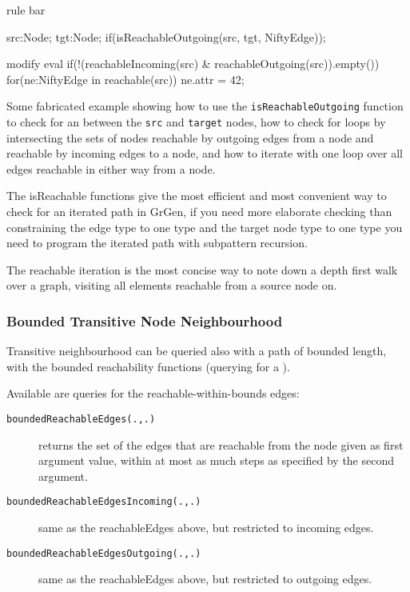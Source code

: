 \begin{example}
\begin{grgen}
rule bar {
    src:Node; 
    tgt:Node;
    if(isReachableOutgoing(src, tgt, NiftyEdge));
    
    modify {
        eval {
            if(!(reachableIncoming(src) & reachableOutgoing(src)).empty())
            {
                for(ne:NiftyEdge in reachable(src))
                {
                    ne.attr = 42;
                }
            }
        }
    }
}
\end{grgen}
Some fabricated example showing how to use the \texttt{isReachableOutgoing} function to check for an  between the \texttt{src} and \texttt{target} nodes, how to check for loops by intersecting the sets of nodes reachable by outgoing edges from a node and reachable by incoming edges to a node, and how to iterate with one loop over all edges reachable in either way from a node.

The isReachable functions give the most efficient and most convenient way to check for an iterated path in GrGen, if you need more elaborate checking than constraining the edge type to one type and the target node type to one type you need to program the iterated path with subpattern recursion.

The reachable iteration is the most concise way to note down a depth first walk over a graph, visiting all elements reachable from a source node on.
\end{example}

\subsubsection*{Bounded Transitive Node Neighbourhood}\label{transitiveneighbourbounded}

Transitive neighbourhood can be queried also with a path of bounded length, with the bounded reachability functions (querying for a ).

Available are queries for the reachable-within-bounds edges:

\begin{description}
\item[\texttt{boundedReachableEdges(.,.)}] returns the set of the edges that are reachable from the node given as first argument value, within at most as much steps as specified by the second argument.
\item[\texttt{boundedReachableEdgesIncoming(.,.)}] same as the reachableEdges above, but restricted to incoming edges.
\item[\texttt{boundedReachableEdgesOutgoing(.,.)}] same as the reachableEdges above, but restricted to outgoing edges.
\end{description}


